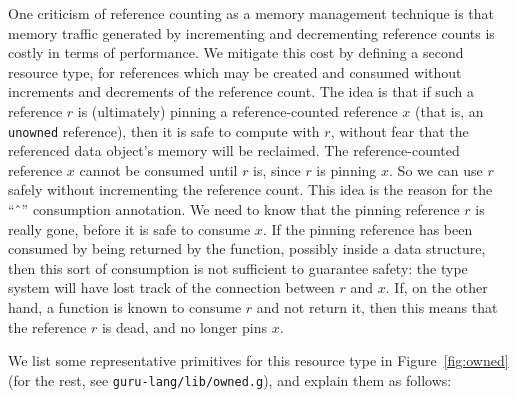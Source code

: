 \documentclass[9pt,natbib]{sigplanconf}
\begin{document}
One criticism of reference counting as a memory management technique
is that memory traffic generated by incrementing and decrementing
reference counts is costly in terms of performance.  We mitigate this
cost by defining a second resource type, for references which may be
created and consumed without increments and decrements of the
reference count.  The idea is that if such a reference $r$ is
(ultimately) pinning a reference-counted reference $x$ (that is, an
\texttt{unowned} reference), then it is safe to compute with $r$,
without fear that the referenced data object's memory will be
reclaimed.  The reference-counted reference $x$ cannot be consumed
until $r$ is, since $r$ is pinning $x$.  So we can use $r$ safely
without incrementing the reference count.  This idea is the reason for
the ``\^{\ }'' consumption annotation.  We need to know that the
pinning reference $r$ is really gone, before it is safe to consume
$x$.  If the pinning reference has been consumed by being returned by
the function, possibly inside a data structure, then this sort of
consumption is not sufficient to guarantee safety: the type system
will have lost track of the connection between $r$ and $x$.  If, on
the other hand, a function is known to consume $r$ and not return it,
then this means that the reference $r$ is dead, and no longer pins
$x$.

We list some representative primitives for this resource type in
Figure~\ref{fig:owned} (for the rest, see
\texttt{guru-lang/lib/owned.g}), and explain them as follows:
\end{document}
